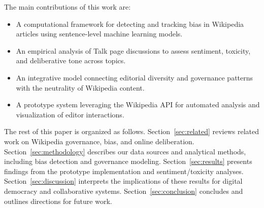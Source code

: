 The main contributions of this work are:
\begin{itemize}
    \item A computational framework for detecting and tracking bias in Wikipedia articles using sentence-level machine learning models.
    \item An empirical analysis of Talk page discussions to assess sentiment, toxicity, and deliberative tone across topics.
    \item An integrative model connecting editorial diversity and governance patterns with the neutrality of Wikipedia content.
    \item A prototype system leveraging the Wikipedia API for automated analysis and visualization of editor interactions.
\end{itemize}

The rest of this paper is organized as follows. 
Section~\ref{sec:related} reviews related work on Wikipedia governance, bias, and online deliberation. 
Section~\ref{sec:methodology} describes our data sources and analytical methods, including bias detection and governance modeling. 
Section~\ref{sec:results} presents findings from the prototype implementation and sentiment/toxicity analyses.
Section~\ref{sec:discussion} interprets the implications of these results for digital democracy and collaborative systems.
Section~\ref{sec:conclusion} concludes and outlines directions for future work.
